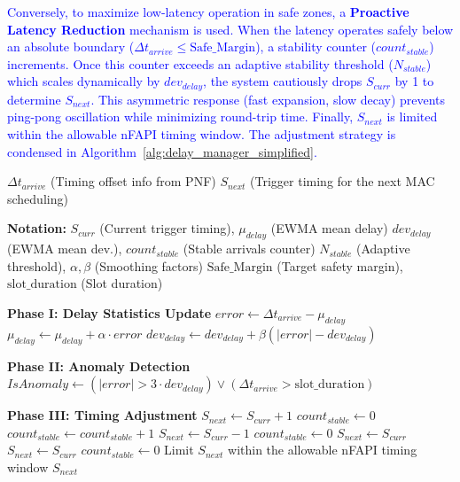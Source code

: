 \documentclass[../my_ntust_thesis.tex]{subfiles}
\begin{document}
\textcolor{blue}{Conversely, to maximize low-latency operation in safe zones, a \textbf{Proactive Latency Reduction} mechanism is used. When the latency operates safely below an absolute boundary ($\Delta t_{arrive} \le \text{Safe\_Margin}$), a stability counter ($count_{stable}$) increments. Once this counter exceeds an adaptive stability threshold ($N_{stable}$) which scales dynamically by $dev_{delay}$, the system cautiously drops $S_{curr}$ by 1 to determine $S_{next}$. This asymmetric response (fast expansion, slow decay) prevents ping-pong oscillation while minimizing round-trip time. Finally, $S_{next}$ is limited within the allowable nFAPI timing window. The adjustment strategy is condensed in Algorithm~\ref{alg:delay_manager_simplified}.}

\begin{algorithm}[H]
\caption{Trigger Timing Control}
\label{alg:delay_manager_simplified}
\small
\begin{algorithmic}[1]
\Require $\Delta t_{arrive}$ (Timing offset info from PNF)
\Ensure $S_{next}$ (Trigger timing for the next MAC scheduling)

\Statex \textbf{Notation:} 
\Statex $S_{curr}$ (Current trigger timing), $\mu_{delay}$ (EWMA mean delay)
\Statex $dev_{delay}$ (EWMA mean dev.), $count_{stable}$ (Stable arrivals counter)
\Statex $N_{stable}$ (Adaptive threshold), $\alpha, \beta$ (Smoothing factors)
\Statex $\text{Safe\_Margin}$ (Target safety margin), $\text{slot\_duration}$ (Slot duration)

\Statex \textbf{Phase I: Delay Statistics Update}
\State $error \gets \Delta t_{arrive} - \mu_{delay}$
\State $\mu_{delay} \gets \mu_{delay} + \alpha \cdot error$
\State $dev_{delay} \gets dev_{delay} + \beta(|error| - dev_{delay})$

\Statex \textbf{Phase II: Anomaly Detection}
\State $IsAnomaly \gets (|error| > 3 \cdot dev_{delay}) \lor (\Delta t_{arrive} > \text{slot\_duration})$

\Statex \textbf{Phase III: Timing Adjustment}
    \State $S_{next} \gets S_{curr} + 1$
    \State $count_{stable} \gets 0$
    \State $count_{stable} \gets count_{stable} + 1$
        \State $S_{next} \gets S_{curr} - 1$
        \State $count_{stable} \gets 0$
    \Else
        \State $S_{next} \gets S_{curr}$
    \EndIf
\Else
    \State $S_{next} \gets S_{curr}$
    \State $count_{stable} \gets 0$
\EndIf
\State Limit $S_{next}$ within the allowable nFAPI timing window
\State \Return $S_{next}$
\end{algorithmic}
\end{algorithm}
\end{document}
